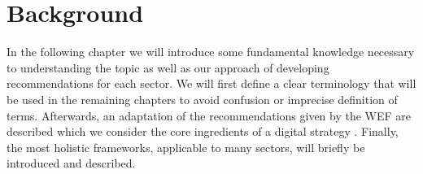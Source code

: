 \section{Background}
In the following chapter we will introduce some fundamental knowledge necessary to understanding the topic as well as our approach of developing recommendations for each sector. We will first define a clear terminology that will be used in the remaining chapters to avoid confusion or imprecise definition of terms. Afterwards, an adaptation of the recommendations given by the \ac{WEF} are described which we consider the core ingredients of a digital strategy \cite{worldforumdigitalenterprise:2016}. Finally, the most holistic frameworks, applicable to many sectors, will briefly be introduced and described.


